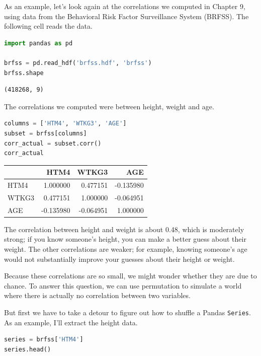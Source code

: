 As an example, let's look again at the correlations we computed in
Chapter 9, using data from the Behavioral Risk Factor Surveillance
System (BRFSS). The following cell reads the data.

\begin{lstlisting}[language=Python,style=source]
import pandas as pd

brfss = pd.read_hdf('brfss.hdf', 'brfss')
brfss.shape
\end{lstlisting}

\begin{lstlisting}[style=output]
(418268, 9)
\end{lstlisting}

The correlations we computed were between height, weight and age.

\begin{lstlisting}[language=Python,style=source]
columns = ['HTM4', 'WTKG3', 'AGE']
subset = brfss[columns]
corr_actual = subset.corr()
corr_actual
\end{lstlisting}

\begin{tabular}{lrrr}
\toprule
{} &      HTM4 &     WTKG3 &       AGE \\
\midrule
HTM4  &  1.000000 &  0.477151 & -0.135980 \\
WTKG3 &  0.477151 &  1.000000 & -0.064951 \\
AGE   & -0.135980 & -0.064951 &  1.000000 \\
\bottomrule
\end{tabular}

The correlation between height and weight is about 0.48, which is
moderately strong; if you know someone's height, you can make a better
guess about their weight. The other correlations are weaker; for
example, knowing someone's age would not substantially improve your
guesses about their height or weight.

Because these correlations are so small, we might wonder whether they
are due to chance. To answer this question, we can use permutation to
simulate a world where there is actually no correlation between two
variables.

But first we have to take a detour to figure out how to shuffle a Pandas
\passthrough{\lstinline!Series!}. As an example, I'll extract the height
data.

\begin{lstlisting}[language=Python,style=source]
series = brfss['HTM4']
series.head()
\end{lstlisting}

